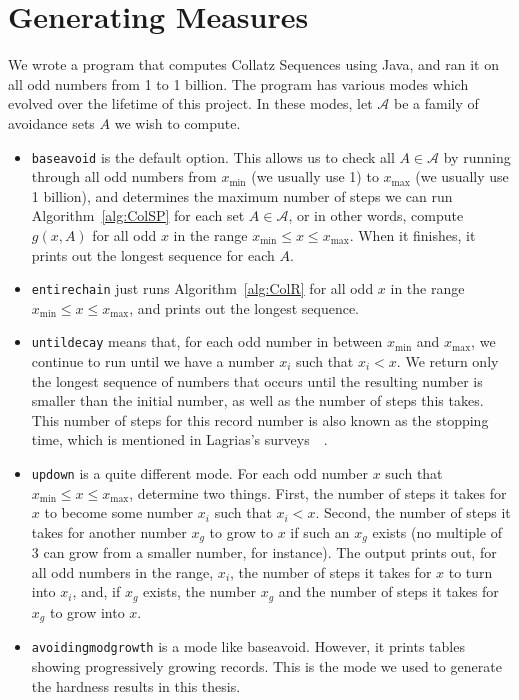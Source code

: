 \section{Generating Measures} \label{subsec:algcomp}
We wrote a program that computes Collatz Sequences using Java, and ran it on all odd numbers from 1 to 1 billion. The program has various modes which evolved over the lifetime of this project. In these modes, let $\mathcal{A}$ be a family of avoidance sets $A$ we wish to compute.
\begin{itemize}
    \item {\tt baseavoid} is the default option. This allows us to check all $A \in \mathcal{A}$ by running through all odd numbers from $x_{\min}$ (we usually use 1) to $x_{\max}$ (we usually use 1 billion), and determines the maximum number of steps we can run Algorithm~\ref{alg:ColSP} for each set $A \in \mathcal{A}$, or in other words, compute $g(x,A)$ for all odd $x$ in the range $x_{\min} \leq x \leq x_{\max}$. When it finishes, it prints out the longest sequence for each $A$.
    \item {\tt entirechain} just runs Algorithm~\ref{alg:ColR} for all odd $x$ in the range $x_{\min} \leq x \leq x_{\max}$, and prints out the longest sequence.
    \item {\tt untildecay} means that, for each odd number in between $x_{\min}$ and $x_{\max}$, we continue to run until we have a number $x_i$ such that $x_i < x$. We return only the longest sequence of numbers that occurs until the resulting number is smaller than the initial number, as well as the number of steps this takes. This number of steps for this record number is also known as the stopping time, which is mentioned in Lagrias's surveys~\cite{2003mathLagrais}~\cite{2006mathLagrias}.
    \item {\tt updown} is a quite different mode. For each odd number $x$ such that $x_{\min}\leq x \leq x_{\max}$, determine two things. First, the number of steps it takes for $x$ to become some number $x_i$ such that $x_i < x$. Second, the number of steps it takes for another number $x_g$ to grow to $x$ if such an $x_g$ exists (no multiple of 3 can grow from a smaller number, for instance). The output prints out, for all odd numbers in the range, $x_i$, the number of steps it takes for $x$ to turn into $x_i$, and, if $x_g$ exists, the number $x_g$ and the number of steps it takes for $x_g$ to grow into $x$.
    \item {\tt avoidingmodgrowth} is a mode like baseavoid. However, it prints tables showing progressively growing records. This is the mode we used to generate the hardness results in this thesis.
\end{itemize}
